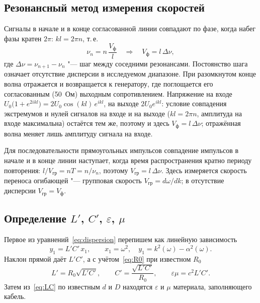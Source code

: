 \documentclass[a4paper,12pt]{article}
\begin{document}
\subsection{Резонансный метод измерения скоростей}
Сигналы в начале и в конце согласованной линии совпадают по фазе, когда
набег фазы кратен $2\pi$: $kl = 2\pi n$, т.\,е.
\begin{equation}
    \label{eq:res_matched}
    \nu_n = n\,\frac{V_\text{ф}}{l}
    \quad\Longrightarrow\quad
    V_\text{ф} = l\,\Delta\nu,
\end{equation}
где $\Delta\nu = \nu_{n+1}-\nu_n$ "--- шаг между соседними резонансами.
Постоянство шага означает отсутствие дисперсии в исследуемом диапазоне.
При разомкнутом конце волна отражается и возвращается к генератору, где
поглощается его согласованным (50~Ом) выходным сопротивлением. Напряжение
на входе $U_0\bigl(1+e^{2ikl}\bigr) = 2U_0\cos(kl)\,e^{ikl}$, на выходе
$2U_0e^{ikl}$: условие совпадения экстремумов и нулей сигналов на входе и
на выходе ($kl = 2\pi n$, амплитуда на входе максимальна) остаётся
тем же, поэтому и здесь $V_\text{ф} = l\,\Delta\nu$; отражённая волна
меняет лишь амплитуду сигнала на входе.

Для последовательности прямоугольных импульсов совпадение импульсов в
начале и в конце линии наступает, когда время распространения кратно
периоду повторения: $l/V_\text{гр} = nT = n/\nu_n$, поэтому
$V_\text{гр} = l\,\Delta\nu$. Здесь измеряется скорость переноса
огибающей "--- групповая скорость $V_\text{гр} = d\omega/dk$; в отсутствие
дисперсии $V_\text{гр} = V_\text{ф}$.

\subsection{Определение $L'$, $C'$, $\varepsilon$, $\mu$}
Первое из уравнений~\eqref{eq:dispersion} перепишем как линейную
зависимость
\begin{equation}
    \label{eq:y1}
    y_1 = L'C'\,x_1,
    \qquad
    x_1 = \omega^2,
    \quad
    y_1 = k^2(\omega)-\alpha^2(\omega).
\end{equation}
Наклон прямой даёт $L'C'$, а с учётом~\eqref{eq:R0} при известном
$R_0$
\begin{equation}
    \label{eq:LC_from_slope}
    L' = R_0\sqrt{L'C'},
    \qquad
    C' = \frac{\sqrt{L'C'}}{R_0},
    \qquad
    \varepsilon\mu = c^2 L'C'.
\end{equation}
Затем из~\eqref{eq:LC} по известным $d$ и $D$ находятся $\varepsilon$ и
$\mu$ материала, заполняющего кабель.
\end{document}
